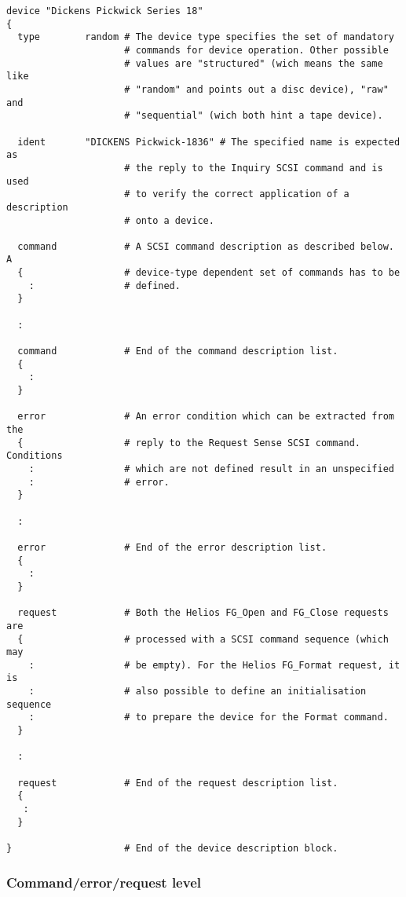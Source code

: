 \begin{listing}
  \begin{verbatim}
device "Dickens Pickwick Series 18"
{
  type        random # The device type specifies the set of mandatory
                     # commands for device operation. Other possible
                     # values are "structured" (wich means the same like
                     # "random" and points out a disc device), "raw" and
                     # "sequential" (wich both hint a tape device).

  ident       "DICKENS Pickwick-1836" # The specified name is expected as
                     # the reply to the Inquiry SCSI command and is used
                     # to verify the correct application of a description
                     # onto a device.

  command            # A SCSI command description as described below. A
  {                  # device-type dependent set of commands has to be
    :                # defined.
  }

  :

  command            # End of the command description list.
  {
    :
  }

  error              # An error condition which can be extracted from the
  {                  # reply to the Request Sense SCSI command. Conditions
    :                # which are not defined result in an unspecified
    :                # error.
  }

  :

  error              # End of the error description list.
  {
    :
  }

  request            # Both the Helios FG_Open and FG_Close requests are
  {                  # processed with a SCSI command sequence (which may
    :                # be empty). For the Helios FG_Format request, it is
    :                # also possible to define an initialisation sequence
    :                # to prepare the device for the Format command.
  }

  :

  request            # End of the request description list.
  {
   :
  }

}                    # End of the device description block.
  \end{verbatim}
\end{listing}


\subsubsection{Command/error/request level}

